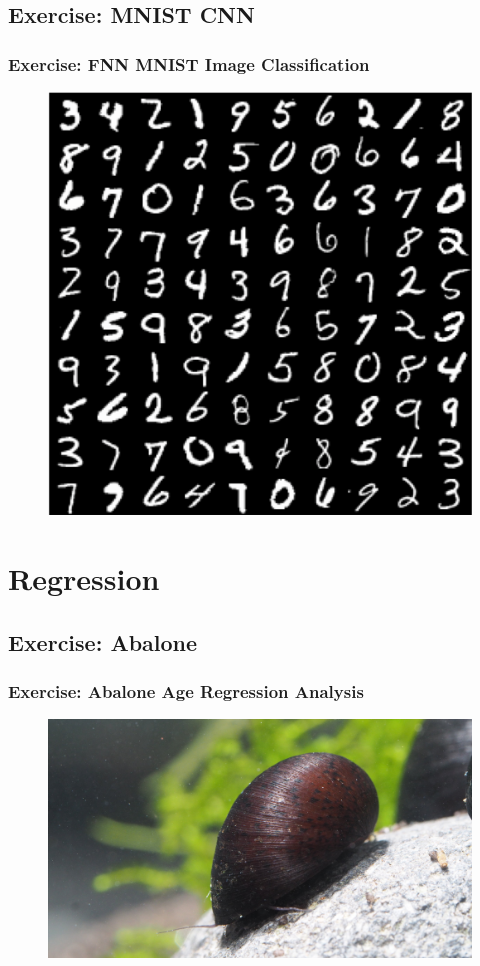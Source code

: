 \documentclass[aspectratio=169]{beamer}
\newcommand\imageright[1]{ %
    \caption*{\scalebox{.5}{\textcolor{lightgray}{\textcopyright~#1}}} %
}
\begin{document}
\subsection{Exercise: MNIST CNN}
\label{subsec:cnn-exercise}

\begin{frame}
\frametitle{Exercise: FNN MNIST Image Classification}

\begin{figure}
    \centering
    \includegraphics[width=0.4\linewidth]{mnist.png}
\end{figure}
\end{frame}

\section{Regression}
\label{sec:regression}

\subsection{Exercise: Abalone}
\label{subsec:regression-exercise}

\begin{frame}
    \frametitle{Exercise: Abalone Age Regression Analysis}
    \begin{figure}
        \centering
        \includegraphics[width=0.7\linewidth]{abalone.jpg}
        \imageright{Garnelaxia}
    \end{figure}
\end{frame}
\end{document}
